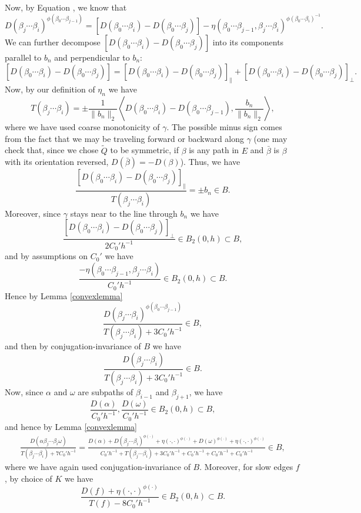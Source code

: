 \documentclass[12pt,reqno]{article}
\makeatletter
\let\reftagform@=\tagform@
\def\tagform@#1{\maketag@@@{(\ignorespaces\textcolor{purple}{#1}\unskip\@@italiccorr)}}
\renewcommand{\eqref}[1]{\textup{\reftagform@{\ref{#1}}}}
\numberwithin{equation}{section}
\newcommand{\pair}[2]{\left\langle #1, #2 \right\rangle}
\makeatother
\begin{document}
Now, by Equation \eqref{eq:noncommdisplacement}, we know that
\[
   D(\beta_j \cdots \beta_i)^{\phi(\beta_0 \cdots \beta_{j-1})} = 
   [D(\beta_0 \cdots \beta_i) - D(\beta_0 \cdots \beta_j)] 
   - \eta( \beta_0 \cdots \beta_{j-1}, \beta_j \cdots \beta_i)^{\phi(\beta_0 \cdots \beta_i)^{-1}}.
\]
We can further decompose $[D(\beta_0 \cdots \beta_i) - D(\beta_0 \cdots \beta_j)]$ into its components parallel to $b_n$ and perpendicular to
$b_n$:
\[
   [D(\beta_0 \cdots \beta_i) - D(\beta_0 \cdots \beta_j)] = 
   [D(\beta_0 \cdots \beta_i) - D(\beta_0 \cdots \beta_j)]_{\parallel} +
   [D(\beta_0 \cdots \beta_i) - D(\beta_0 \cdots \beta_j)]_{\perp}.
\]
Now, by our definition of $\eta_n$ we have
\[ 
   T(\beta_j \cdots \beta_i) = 
   \pm \frac{1}{\|b_n\|_2} \pair{D( \beta_0 \cdots \beta_i) - D( \beta_0 \cdots \beta_{j-1}) }{ \frac{b_n}{\|b_n\|_2}},
\]
where we have used coarse monotonicity of $\gamma$. The possible minus sign comes from the fact that we may be traveling forward or 
backward along $\gamma$ (one may check that, since we chose $\tilde{Q}$ to be symmetric, if $\beta$ is any path in $E$ and
$\bar{\beta}$ is $\beta$ with its orientation
reversed, $D(\bar{\beta}) = -D(\beta)$).
Thus, we have
\[
   \frac{ [D(\beta_0 \cdots \beta_i) - D(\beta_0 \cdots \beta_j)]_{\parallel} }{ T(\beta_j \cdots \beta_i) } = \pm b_n \in B.
\]
Moreover, since $\gamma$ stays near to the line through $b_n$ we have
\[
   \frac{ [D(\beta_0 \cdots \beta_i) - D(\beta_0 \cdots \beta_j)]_{\perp} }{ 2 C_0' h^{-1} } \in B_2(0,h) \subset B,
\]
and by assumptions on $C_0'$ we have
\[
   \frac{-\eta(\beta_0 \cdots \beta_{j-1}, \beta_j \cdots \beta_i) }{ C_0' h^{-1} } \in B_2(0,h) \subset B.
\]
Hence by Lemma \ref{convexlemma}
\[
   \frac{D(\beta_j \cdots \beta_i)^{\phi(\beta_0 \cdots \beta_{j-1})}}{ T(\beta_j \cdots \beta_i) + 3C_0' h^{-1} } \in B,
\]
and then by conjugation-invariance of $B$ we have
\[
   \frac{D(\beta_j \cdots \beta_i)}{ T(\beta_j \cdots \beta_i) + 3C_0' h^{-1}} \in B.
\]
Now, since $\alpha$ and $\omega$ are subpaths of  $\beta_{i-1}$ and $\beta_{j+1}$, we have
\[
   \frac{D(\alpha)}{C_0' h^{-1}} , \frac{D(\omega)}{C_0' h^{-1}} \in B_2(0,h) \subset B,
\]
and hence by Lemma \ref{convexlemma}
\begin{align*}
   \frac{D(\alpha \beta_j \cdots \beta_i \omega)}{ T(\beta_j \cdots \beta_i) + 7 C_0' h^{-1} } 
   = \frac{ D(\alpha) + D(\beta_j \cdots \beta_i)^{\phi(\cdot)} 
   + \eta(\cdot,\cdot)^{\phi(\cdot)} + D(\omega)^{\phi(\cdot)} + \eta(\cdot, \cdot)^{\phi(\cdot)}}
   { C_0' h^{-1} + T(\beta_j \cdots \beta_i) + 3 C_0' h^{-1} + C_0' h^{-1} + C_0' h^{-1} + C_0' h^{-1}} \in B,
\end{align*}
where we have again used conjugation-invariance of $B$.
Moreover, for slow edges $f$, by choice of $K$ we have
\[
   \frac{ D(f) + \eta(\cdot, \cdot)^{\phi(\cdot)} }{ T(f) - 8 C_0' h^{-1} } \in B_2(0,h) \subset B.
\]
\end{document}
